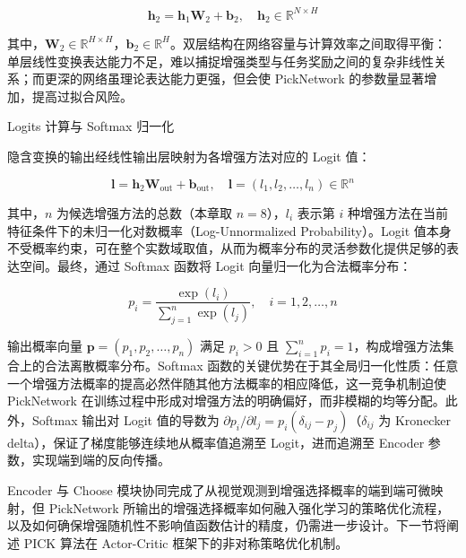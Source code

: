 \begin{equation}
    \mathbf{h}_2 = \mathbf{h}_1 \mathbf{W}_2 + \mathbf{b}_2, \quad \mathbf{h}_2 \in \mathbb{R}^{N \times H}
\end{equation}

其中，$\mathbf{W}_2 \in \mathbb{R}^{H \times H}$，$\mathbf{b}_2 \in \mathbb{R}^H$。双层结构在网络容量与计算效率之间取得平衡：单层线性变换表达能力不足，难以捕捉增强类型与任务奖励之间的复杂非线性关系；而更深的网络虽理论表达能力更强，但会使 PickNetwork 的参数量显著增加，提高过拟合风险。

Logits 计算与 Softmax 归一化

隐含变换的输出经线性输出层映射为各增强方法对应的 Logit 值：

\begin{equation}
    \mathbf{l} = \mathbf{h}_2 \mathbf{W}_{\text{out}} + \mathbf{b}_{\text{out}}, \quad \mathbf{l} = (l_1, l_2, \ldots, l_n) \in \mathbb{R}^n
\end{equation}

其中，$n$ 为候选增强方法的总数（本章取 $n=8$），$l_i$ 表示第 $i$ 种增强方法在当前特征条件下的未归一化对数概率（Log-Unnormalized Probability）。Logit 值本身不受概率约束，可在整个实数域取值，从而为概率分布的灵活参数化提供足够的表达空间。最终，通过 Softmax 函数将 Logit 向量归一化为合法概率分布：

\begin{equation}
    p_i = \frac{\exp(l_i)}{\displaystyle\sum_{j=1}^{n} \exp(l_j)}, \quad i = 1, 2, \ldots, n
\end{equation}

输出概率向量 $\mathbf{p} = (p_1, p_2, \ldots, p_n)$ 满足 $p_i > 0$ 且 $\sum_{i=1}^n p_i = 1$，构成增强方法集合上的合法离散概率分布。Softmax 函数的关键优势在于其全局归一化性质：任意一个增强方法概率的提高必然伴随其他方法概率的相应降低，这一竞争机制迫使 PickNetwork 在训练过程中形成对增强方法的明确偏好，而非模糊的均等分配。此外，Softmax 输出对 Logit 值的导数为 $\partial p_i / \partial l_j = p_i(\delta_{ij} - p_j)$（$\delta_{ij}$ 为 Kronecker delta），保证了梯度能够连续地从概率值追溯至 Logit，进而追溯至 Encoder 参数，实现端到端的反向传播。

Encoder 与 Choose 模块协同完成了从视觉观测到增强选择概率的端到端可微映射，但 PickNetwork 所输出的增强选择概率如何融入强化学习的策略优化流程，以及如何确保增强随机性不影响值函数估计的精度，仍需进一步设计。下一节将阐述 PICK 算法在 Actor-Critic 框架下的非对称策略优化机制。


